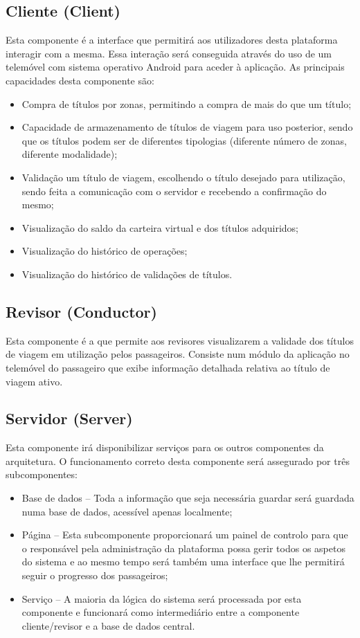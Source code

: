 \subsection{Cliente (Client)}

Esta componente é a interface que permitirá aos utilizadores desta plataforma interagir com a mesma. Essa interação será conseguida através do uso de um telemóvel com sistema operativo Android para aceder à aplicação. As principais capacidades desta componente são:
\begin{itemize}
\item Compra de títulos por zonas, permitindo a compra de mais do que um título;
\item Capacidade de armazenamento de títulos de viagem para uso posterior, sendo que os títulos podem ser de diferentes tipologias (diferente número de zonas, diferente modalidade);
\item Validação um título de viagem, escolhendo o título desejado para utilização, sendo feita a comunicação com o servidor e recebendo a confirmação do mesmo;
\item Visualização do saldo da carteira virtual e dos títulos adquiridos;
\item Visualização do histórico de operações;
\item Visualização do histórico de validações de títulos.
\end{itemize}

\subsection{Revisor (Conductor)}

Esta componente é a que permite aos revisores visualizarem a validade dos títulos de viagem em utilização pelos passageiros. Consiste num módulo da aplicação no telemóvel do passageiro que exibe informação detalhada relativa ao título de viagem ativo.

\subsection{Servidor (Server)}

Esta componente irá disponibilizar serviços para os outros componentes da arquitetura. O funcionamento correto desta componente será assegurado por três subcomponentes:
\begin{itemize}
\item Base de dados – Toda a informação que seja necessária guardar será guardada numa base de dados, acessível apenas localmente;
\item Página \web – Esta subcomponente proporcionará um painel de controlo para que o responsável pela administração da plataforma possa gerir todos os aspetos do sistema e ao mesmo tempo será também uma interface que lhe permitirá seguir o progresso dos passageiros;
\item Serviço \web – A maioria da lógica do sistema será processada por esta componente e funcionará como intermediário entre a componente cliente/revisor e a base de dados central.
\end{itemize}

